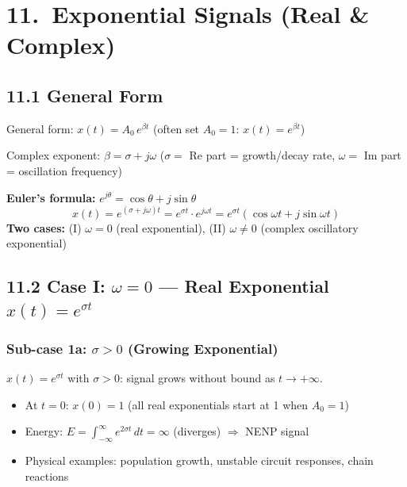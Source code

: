 \documentclass[10pt,a4paper]{article}
\begin{document}
\section{11.\ Exponential Signals (Real \& Complex)}

\subsection*{11.1 General Form}

\begin{expbox2}
General form: $x(t) = A_0\,e^{\beta t}$ \quad (often set $A_0 = 1$: $x(t) = e^{\beta t}$)

Complex exponent: $\beta = \sigma + j\omega$ \;($\sigma = $ Re part = growth/decay rate, $\omega = $ Im part = oscillation frequency)

\textbf{Euler's formula:} $e^{j\theta} = \cos\theta + j\sin\theta$
\[
x(t) = e^{(\sigma+j\omega)t} = e^{\sigma t} \cdot e^{j\omega t} = e^{\sigma t}(\cos\omega t + j\sin\omega t)
\]
\textbf{Two cases:} (I) $\omega = 0$ (real exponential), (II) $\omega \neq 0$ (complex oscillatory exponential)
\end{expbox2}

\subsection*{11.2 Case I: $\omega = 0$ --- Real Exponential $x(t) = e^{\sigma t}$}

\subsubsection*{Sub-case 1a: $\sigma > 0$ (Growing Exponential)}

\begin{propbox}
$x(t) = e^{\sigma t}$ with $\sigma > 0$: signal grows without bound as $t \to +\infty$.
\begin{itemize}
  \item At $t = 0$: $x(0) = 1$ (all real exponentials start at 1 when $A_0=1$)
  \item Energy: $E = \int_{-\infty}^{\infty}e^{2\sigma t}\,dt = \infty$ (diverges) $\Rightarrow$ NENP signal
  \item Physical examples: population growth, unstable circuit responses, chain reactions
\end{itemize}
\end{propbox}
\end{document}
